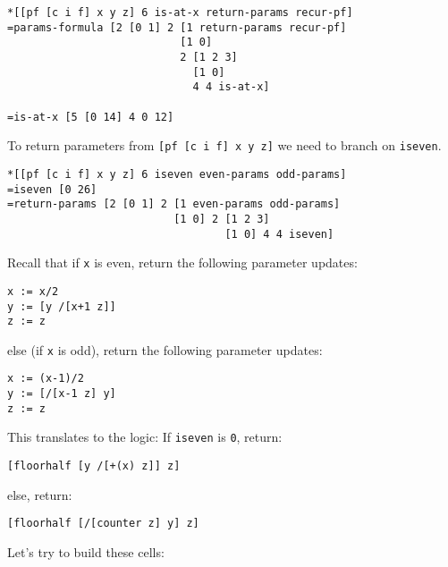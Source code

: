 \documentclass[twoside]{article}
\begin{document}
\begin{lstlisting}[style=listingblock]
*[[pf [c i f] x y z] 6 is-at-x return-params recur-pf]
=params-formula [2 [0 1] 2 [1 return-params recur-pf]
                           [1 0]
                           2 [1 2 3]
                             [1 0]
                             4 4 is-at-x]

=is-at-x [5 [0 14] 4 0 12]
\end{lstlisting}

To return parameters from \lstinline[style=inlinecode]{[pf [c i f] x y z]} we need to branch on \lstinline[style=inlinecode]{iseven}.

\begin{lstlisting}[style=listingblock]
*[[pf [c i f] x y z] 6 iseven even-params odd-params]
=iseven [0 26]
=return-params [2 [0 1] 2 [1 even-params odd-params]
                          [1 0] 2 [1 2 3]
                                  [1 0] 4 4 iseven]
\end{lstlisting}

\noindent
Recall that if \lstinline[style=inlinecode]{x} is even, return the following parameter updates:

\begin{lstlisting}[style=listingblock]
x := x/2
y := [y /[x+1 z]]
z := z
\end{lstlisting}

\noindent
else (if \lstinline[style=inlinecode]{x} is odd), return the following parameter updates:

\begin{lstlisting}[style=listingblock]
x := (x-1)/2
y := [/[x-1 z] y]
z := z
\end{lstlisting}

\noindent
This translates to the logic:  If \lstinline[style=inlinecode]{iseven} is \lstinline[style=inlinecode]{0}, return:
\begin{lstlisting}[style=listingblock]
[floorhalf [y /[+(x) z]] z]
\end{lstlisting}
else, return:
\begin{lstlisting}[style=listingblock]
[floorhalf [/[counter z] y] z]
\end{lstlisting}

Let's try to build these cells:
\end{document}
